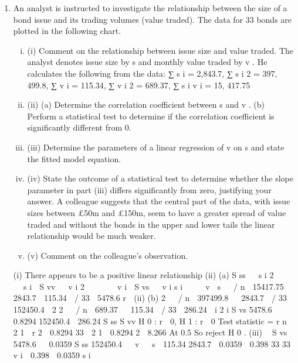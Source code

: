 \documentclass[a4paper,12pt]{article}
\begin{document}
\begin{enumerate}
\item An analyst is instructed to investigate the relationship between the size of a bond issue and its trading volumes (value traded). The data for 33 bonds are plotted in the following chart.

\begin{enumerate}[(i)]
\item (i)
Comment on the relationship between issue size and value traded. 
The analyst denotes issue size by s and monthly value traded by v . He calculates the following from the data:
∑ s i = 2,843.7, ∑ s i 2 = 397, 499.8, ∑ v i = 115.34, ∑ v i 2 = 689.37, ∑ s i v i = 15, 417.75
\item (ii)
(a) Determine the correlation coefficient between s and v .
(b) Perform a statistical test to determine if the correlation coefficient is significantly different from 0.

\item
(iii) Determine the parameters of a linear regression of v on s and state the fitted model equation.

\item
(iv) State the outcome of a statistical test to determine whether the slope parameter in part (iii) differs significantly from zero, justifying your answer. A colleague suggests that the central part of the data, with issue sizes between £50m
and £150m, seem to have a greater spread of value traded and without the bonds in
the upper and lower tails the linear relationship would be much weaker.
\item
(v) Comment on the colleague’s observation.
\end{enumerate}

(i) There appears to be a positive linear relationship
(ii) (a)
S ss   s i 2   
   s i 
S vv   v i 2   
   v i 
S vs   v i s i     v  s   / n  15417.75   2843.7  115.34  / 33  5478.6
r 
(ii)
(b)
2 
 / n  397499.8   2843.7  / 33  152450.4

2
2 
 / n  689.37   115.34  / 33  286.24

i
2
i
S vs
5478.6

 0.8294
152450.4  286.24
S ss S vv
H 0 : r  0, H 1 : r  0
Test statistic = r
n  2
1  r
2

0.8294 33  2
1  0.8294
2
 8.266
At 0.5%
So reject H 0 .
(iii)

S vs
5478.6

 0.0359
S ss 152450.4
  v   s 
115.34
2843.7
 0.0359
 0.398
33
33
v i  0.398  0.0359 s i


\end{enumerate}
\end{document}
